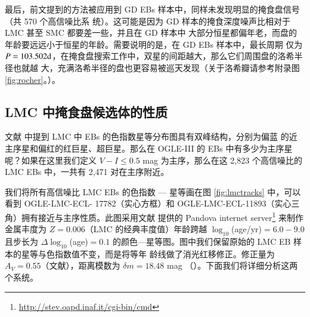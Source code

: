 最后，前文提到的方法被应用到 GD EBs 样本中，同样未发现明显的掩食盘信号（共 570 个高信噪比系
统）。这可能是因为 GD 样本的掩食深度噪声比相对于 LMC 甚至 SMC 都要差一些，并且在 GD 样本中
大部分恒星都偏年老，而盘的年龄要远远小于恒星的年龄。需要说明的是，在 GD EBs 样本中，最长周期
仅为 $P = 103.502 \mathrm{d}$，在掩食盘搜索工作中，双星的间距越大，那么它们周围盘的洛希半径也就越
大，充满洛希半径的盘也更容易被巡天发现（关于洛希瓣请参考附录图 \ref{fig:rocher}。）。

\subsection{LMC 中掩食盘候选体的性质} \label{sec:discebprop}

文献 \cite{Derekas2007,Graczyk2011} 中提到 LMC 中 EBs 的色指数星等分布图具有双峰结构，分别为偏蓝
的近主序星和偏红的红巨星、超巨星。那么在 OGLE-III 的 EBs 中有多少为主序星呢？如果在这里我们定义
$V - I \le 0.5 $ mag 为主序，那么在这 2,823 个高信噪比的 LMC EBs 中，一共有 2,471 对在主序附近。


我们将所有高信噪比 LMC EBs 的色指数 --- 星等画在图 \ref{fig:lmctracks} 中，可以看到 OGLE-LMC-ECL- 
17782（实心方框）和 OGLE-LMC-ECL-11893（实心三角）拥有接近与主序性质。此图采用文献 
 提供的 Pandova internet server\footnote{\url{http://stev.oapd.inaf.it/cgi-bin/cmd}} 来制作
金属丰度为 $Z=0.006$（LMC 的经典丰度值）年龄跨越 $\log_{10}$(age/yr)$=6.0-9.0$ 且步长为 $\Delta 
\log_{10}$(age)$=0.1$ 的颜色---星等图。图中我们保留原始的 LMC EB 样本的星等与色指数值不变，而是将等年
龄线做了消光红移修正。修正量为 $A_V=0.55$（文献），距离模数为 $\delta m=18.48$ mag 
（）。下面我们将详细分析这两个系统。


